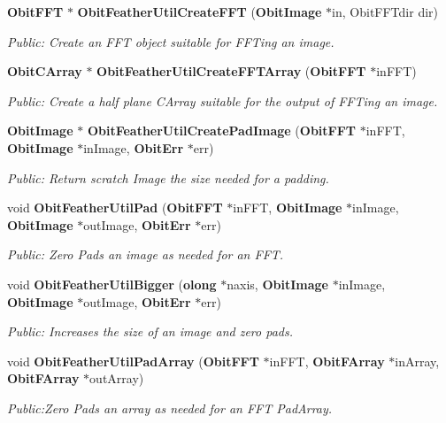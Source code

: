 \begin{CompactItemize}
\item 
{\bf Obit\-FFT} $\ast$ {\bf Obit\-Feather\-Util\-Create\-FFT} ({\bf Obit\-Image} $\ast$in, Obit\-FFTdir dir)
\begin{CompactList}\small\item\em Public: Create an FFT object suitable for FFTing an image. \item\end{CompactList}\item 
{\bf Obit\-CArray} $\ast$ {\bf Obit\-Feather\-Util\-Create\-FFTArray} ({\bf Obit\-FFT} $\ast$in\-FFT)
\begin{CompactList}\small\item\em Public: Create a half plane CArray suitable for the output of FFTing an image. \item\end{CompactList}\item 
{\bf Obit\-Image} $\ast$ {\bf Obit\-Feather\-Util\-Create\-Pad\-Image} ({\bf Obit\-FFT} $\ast$in\-FFT, {\bf Obit\-Image} $\ast$in\-Image, {\bf Obit\-Err} $\ast$err)
\begin{CompactList}\small\item\em Public: Return scratch Image the size needed for a padding. \item\end{CompactList}\item 
void {\bf Obit\-Feather\-Util\-Pad} ({\bf Obit\-FFT} $\ast$in\-FFT, {\bf Obit\-Image} $\ast$in\-Image, {\bf Obit\-Image} $\ast$out\-Image, {\bf Obit\-Err} $\ast$err)
\begin{CompactList}\small\item\em Public: Zero Pads an image as needed for an FFT. \item\end{CompactList}\item 
void {\bf Obit\-Feather\-Util\-Bigger} ({\bf olong} $\ast$naxis, {\bf Obit\-Image} $\ast$in\-Image, {\bf Obit\-Image} $\ast$out\-Image, {\bf Obit\-Err} $\ast$err)
\begin{CompactList}\small\item\em Public: Increases the size of an image and zero pads. \item\end{CompactList}\item 
void {\bf Obit\-Feather\-Util\-Pad\-Array} ({\bf Obit\-FFT} $\ast$in\-FFT, {\bf Obit\-FArray} $\ast$in\-Array, {\bf Obit\-FArray} $\ast$out\-Array)
\begin{CompactList}\small\item\em Public:Zero Pads an array as needed for an FFT Pad\-Array. \item\end{CompactList}\item 

\end{CompactItemize}
